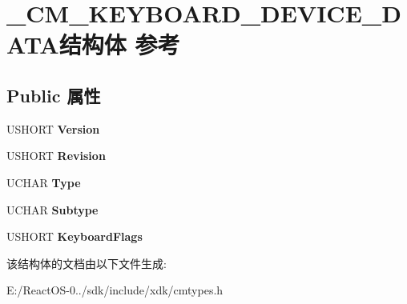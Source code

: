 \hypertarget{struct___c_m___k_e_y_b_o_a_r_d___d_e_v_i_c_e___d_a_t_a}{}\section{\+\_\+\+C\+M\+\_\+\+K\+E\+Y\+B\+O\+A\+R\+D\+\_\+\+D\+E\+V\+I\+C\+E\+\_\+\+D\+A\+T\+A结构体 参考}
\label{struct___c_m___k_e_y_b_o_a_r_d___d_e_v_i_c_e___d_a_t_a}
\subsection*{Public 属性}
\begin{DoxyCompactItemize}
\item 
\mbox{\label{struct___c_m___k_e_y_b_o_a_r_d___d_e_v_i_c_e___d_a_t_a_a2ddb3b39fd50b117ab68e3f5939f83ab}} 
U\+S\+H\+O\+RT {\bfseries Version}
\item 
\mbox{\label{struct___c_m___k_e_y_b_o_a_r_d___d_e_v_i_c_e___d_a_t_a_af0f90191cf74b264a0f7d5e61f20364d}} 
U\+S\+H\+O\+RT {\bfseries Revision}
\item 
\mbox{\label{struct___c_m___k_e_y_b_o_a_r_d___d_e_v_i_c_e___d_a_t_a_ae582061b993ed8db34e95c3fd87c39d7}} 
U\+C\+H\+AR {\bfseries Type}
\item 
\mbox{\label{struct___c_m___k_e_y_b_o_a_r_d___d_e_v_i_c_e___d_a_t_a_a1aa800a402128a8da91f1b1da5761da9}} 
U\+C\+H\+AR {\bfseries Subtype}
\item 
\mbox{\label{struct___c_m___k_e_y_b_o_a_r_d___d_e_v_i_c_e___d_a_t_a_af548a2aa1bf912236a798d00c830e1e0}} 
U\+S\+H\+O\+RT {\bfseries Keyboard\+Flags}
\end{DoxyCompactItemize}


该结构体的文档由以下文件生成\+:\begin{DoxyCompactItemize}
\item 
E\+:/\+React\+O\+S-\/0../sdk/include/xdk/cmtypes.\+h\end{DoxyCompactItemize}
